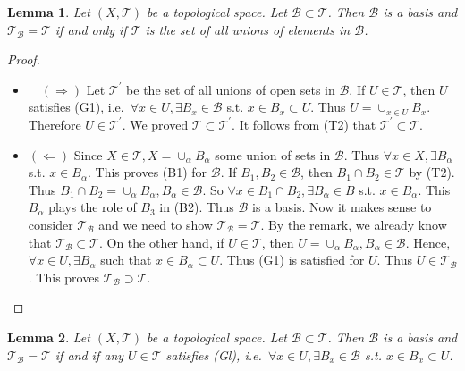 \documentclass[
]{book}
\providecommand{\tightlist}{%
  \setlength{\itemsep}{0pt}\setlength{\parskip}{0pt}}
\newtheorem{lemma}{Lemma}[chapter]
\theoremstyle{definition}
\theoremstyle{definition}
\theoremstyle{definition}
\theoremstyle{definition}
\theoremstyle{remark}
\begin{document}
\begin{lemma}
\protect\hypertarget{lem:unnamed-chunk-14}{}\label{lem:unnamed-chunk-14}Let \((X, \mathcal{T})\) be a topological space. Let \(\mathcal{B} \subset \mathcal{T}\). Then \(\mathcal{B}\) is a basis and \(\mathcal{T}_{\mathcal{B}}=\mathcal{T}\) if and only if \(\mathcal{T}\) is the set of all unions of elements in \(\mathcal{B}\).
\end{lemma}

\begin{proof}
\leavevmode

\begin{itemize}
\tightlist
\item
  \(\quad(\Rightarrow)\) Let \(\mathcal{T}^{\prime}\) be the set of all unions of open sets in \(\mathcal{B}\). If \(U \in \mathcal{T}\), then \(U\) satisfies (G1), i.e.~\(\forall x \in U, \exists B_{x} \in \mathcal{B}\) s.t. \(x \in B_{x} \subset U\). Thus \(U=\cup_{x \in U} B_{x}\). Therefore \(U \in \mathcal{T}^{\prime}\). We proved \(\mathcal{T} \subset \mathcal{T}^{\prime}\). It follows from (T2) that \(\mathcal{T}^{\prime} \subset \mathcal{T}\).
\item
  \((\Leftarrow)\) Since \(X \in \mathcal{T}, X=\cup_{\alpha} B_{\alpha}\) some union of sets in \(\mathcal{B}\). Thus \(\forall x \in X, \exists B_{\alpha}\) s.t. \(x \in B_{\alpha}\). This proves (B1) for \(\mathcal{B}\). If \(B_{1}, B_{2} \in \mathcal{B}\), then \(B_{1} \cap B_{2} \in \mathcal{T}\) by (T2). Thus \(B_{1} \cap B_{2}=\cup_{\alpha} B_{\alpha}, B_{\alpha} \in \mathcal{B}\). So \(\forall x \in B_{1} \cap B_{2}, \exists B_{\alpha} \in B\) s.t. \(x \in B_{\alpha}\). This \(B_{\alpha}\) plays the role of \(B_{3}\) in (B2). Thus \(\mathcal{B}\) is a basis. Now it makes sense to consider \(\mathcal{T}_{\mathcal{B}}\) and we need to show \(\mathcal{T}_{\mathcal{B}}=\mathcal{T}\). By the remark, we already know that \(\mathcal{T}_{\mathcal{B}} \subset \mathcal{T}\). On the other hand, if \(U \in \mathcal{T}\), then \(U=\cup_{\alpha} B_{\alpha}, B_{\alpha} \in \mathcal{B}\). Hence, \(\forall x \in U, \exists B_{\alpha}\) such that \(x \in B_{\alpha} \subset U\). Thus (G1) is satisfied for \(U\). Thus \(U \in \mathcal{T}_{\mathcal{B}}\). This proves \(\mathcal{T}_{\mathcal{B}} \supset \mathcal{T}\).
\end{itemize}

\end{proof}

\begin{lemma}
\protect\hypertarget{lem:unnamed-chunk-16}{}\label{lem:unnamed-chunk-16}Let \((X, \mathcal{T})\) be a topological space. Let \(\mathcal{B} \subset \mathcal{T}\). Then \(\mathcal{B}\) is a basis and \(\mathcal{T}_{\mathcal{B}}=\mathcal{T}\) if and if any \(U \in \mathcal{T}\) satisfies (Gl), i.e.~\(\forall x \in U, \exists B_{x} \in \mathcal{B}\) s.t. \(x \in B_{x} \subset U\).
\end{lemma}
\end{document}

